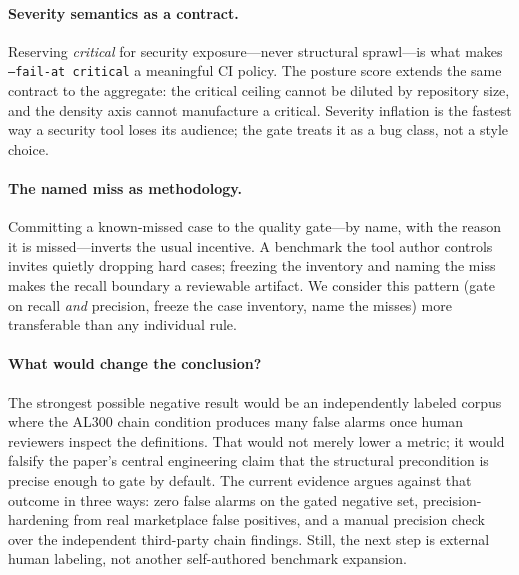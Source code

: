\documentclass[11pt]{article}
\begin{document}
\paragraph{Severity semantics as a contract.}
Reserving \emph{critical} for security exposure---never structural sprawl---is what makes
\texttt{--fail-at critical} a meaningful CI policy. The posture score extends the same contract to
the aggregate: the critical ceiling cannot be diluted by repository size, and the density axis
cannot manufacture a critical. Severity inflation is the fastest way a security tool loses its
audience; the gate treats it as a bug class, not a style choice.

\paragraph{The named miss as methodology.}
Committing a known-missed case to the quality gate---by name, with the reason it is
missed---inverts the usual incentive. A benchmark the tool author controls invites quietly
dropping hard cases; freezing the inventory and naming the miss makes the recall boundary a
reviewable artifact. We consider this pattern (gate on recall \emph{and} precision, freeze the
case inventory, name the misses) more transferable than any individual rule.

\paragraph{What would change the conclusion?}
The strongest possible negative result would be an independently labeled corpus where the AL300
chain condition produces many false alarms once human reviewers inspect the definitions. That would
not merely lower a metric; it would falsify the paper's central engineering claim that the
structural precondition is precise enough to gate by default. The current evidence argues against
that outcome in three ways: zero false alarms on the gated negative set, precision-hardening from
real marketplace false positives, and a manual precision check over the independent third-party
chain findings. Still, the next step is external human labeling, not another self-authored
benchmark expansion.
\end{document}
